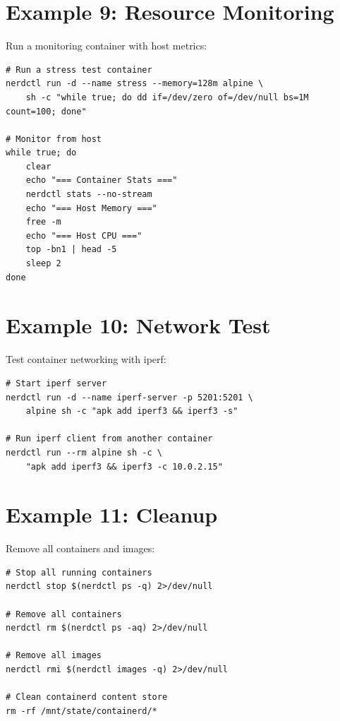 \section{Example 9: Resource Monitoring}

Run a monitoring container with host metrics:

\begin{lstlisting}
# Run a stress test container
nerdctl run -d --name stress --memory=128m alpine \
    sh -c "while true; do dd if=/dev/zero of=/dev/null bs=1M count=100; done"

# Monitor from host
while true; do
    clear
    echo "=== Container Stats ==="
    nerdctl stats --no-stream
    echo "=== Host Memory ==="
    free -m
    echo "=== Host CPU ==="
    top -bn1 | head -5
    sleep 2
done
\end{lstlisting}

\section{Example 10: Network Test}

Test container networking with iperf:

\begin{lstlisting}
# Start iperf server
nerdctl run -d --name iperf-server -p 5201:5201 \
    alpine sh -c "apk add iperf3 && iperf3 -s"

# Run iperf client from another container
nerdctl run --rm alpine sh -c \
    "apk add iperf3 && iperf3 -c 10.0.2.15"
\end{lstlisting}

\section{Example 11: Cleanup}

Remove all containers and images:

\begin{lstlisting}
# Stop all running containers
nerdctl stop $(nerdctl ps -q) 2>/dev/null

# Remove all containers
nerdctl rm $(nerdctl ps -aq) 2>/dev/null

# Remove all images
nerdctl rmi $(nerdctl images -q) 2>/dev/null

# Clean containerd content store
rm -rf /mnt/state/containerd/*
\end{lstlisting}
